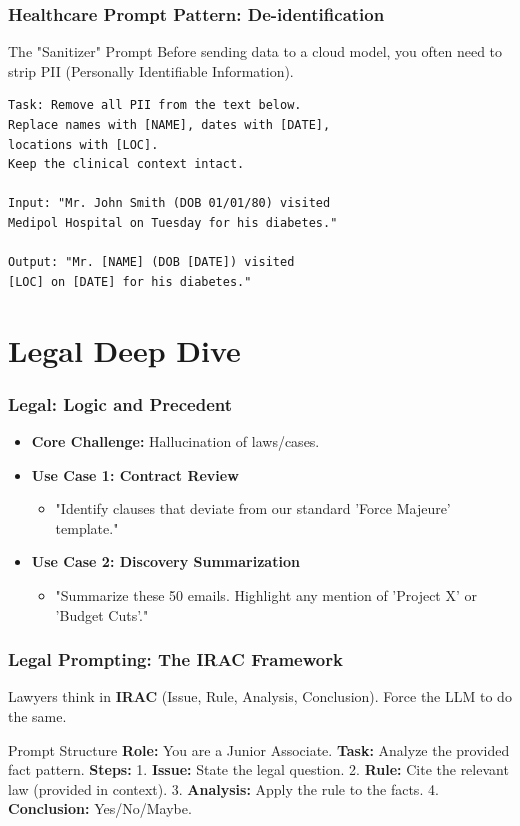 \documentclass{beamer}
\begin{document}
\begin{frame}[fragile]
    \frametitle{Healthcare Prompt Pattern: De-identification}
    \begin{block}{The "Sanitizer" Prompt}
        Before sending data to a cloud model, you often need to strip PII (Personally Identifiable Information).
    \end{block}
\begin{verbatim}
Task: Remove all PII from the text below.
Replace names with [NAME], dates with [DATE], 
locations with [LOC].
Keep the clinical context intact.

Input: "Mr. John Smith (DOB 01/01/80) visited 
Medipol Hospital on Tuesday for his diabetes."

Output: "Mr. [NAME] (DOB [DATE]) visited 
[LOC] on [DATE] for his diabetes."
\end{verbatim}
\end{frame}

\section{Legal Deep Dive}

\begin{frame}
    \frametitle{Legal: Logic and Precedent}
    \begin{itemize}
        \item \textbf{Core Challenge:} Hallucination of laws/cases.
        \item \textbf{Use Case 1: Contract Review}
        \begin{itemize}
            \item "Identify clauses that deviate from our standard 'Force Majeure' template."
        \end{itemize}
        \item \textbf{Use Case 2: Discovery Summarization}
        \begin{itemize}
            \item "Summarize these 50 emails. Highlight any mention of 'Project X' or 'Budget Cuts'."
        \end{itemize}
    \end{itemize}
\end{frame}

\begin{frame}
    \frametitle{Legal Prompting: The IRAC Framework}
    Lawyers think in \textbf{IRAC} (Issue, Rule, Analysis, Conclusion). Force the LLM to do the same.
    \begin{block}{Prompt Structure}
        \textbf{Role:} You are a Junior Associate.
        \textbf{Task:} Analyze the provided fact pattern.
        \textbf{Steps:}
        1. \textbf{Issue:} State the legal question.
        2. \textbf{Rule:} Cite the relevant law (provided in context).
        3. \textbf{Analysis:} Apply the rule to the facts.
        4. \textbf{Conclusion:} Yes/No/Maybe.
    \end{block}
\end{frame}
\end{document}
